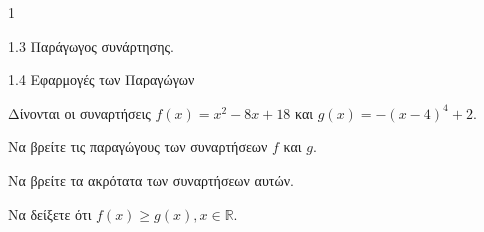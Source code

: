\begin{ylh}{1}
	\item 1.3 Παράγωγος συνάρτησης.
	\item 1.4 Εφαρμογές των Παραγώγων
\end{ylh}
Δίνονται οι συναρτήσεις $f(x) = x^2 - 8x + 18$ και $g(x) = -(x-4)^4 + 2$.
\begin{alist}
	\item Να βρείτε τις παραγώγους των συναρτήσεων $f$ και $g$. 
	\item Να βρείτε τα ακρότατα των συναρτήσεων αυτών. 
	\item Να δείξετε ότι $f(x) \geq g(x), x \in \mathbb{R}$. 
\end{alist}

